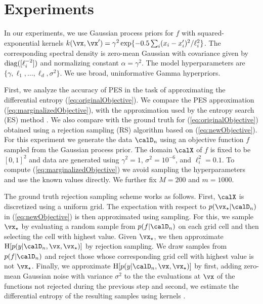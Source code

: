 \section{Experiments}
\label{sec:experiments}

In our experiments, we use Gaussian process priors for $f$ with squared-exponential
kernels $k(\x,\x')=\gamma^2\exp\{-0.5 \sum_i (x_i-x_i')^2/\ell_i^2\}$.
The corresponding spectral density is zero-mean
Gaussian with covariance given by $\mathrm{diag}([\ell_i^{-2}])$ and normalizing constant $\alpha=\gamma^2$.
The model hyperparameters are $\{\gamma,\ell_1,\dots,\ell_d,\sigma^2\}$. 
We use broad, uninformative Gamma hyperpriors. 

First, we analyze the accuracy of PES in the task of approximating the differential entropy
(\ref{eq:originalObjective}).  We compare the PES approximation
(\ref{eq:marginalizedObjective}),
with the approximation used by the entropy
search (ES) method \cite{HennigSchuler:2012}.  We also compare with the ground
truth for (\ref{eq:originalObjective}) obtained using a rejection sampling (RS)
algorithm based on (\ref{eq:newObjective}).  For this experiment we generate the
data $\D_n$ using an objective function $f$ sampled from the Gaussian
process prior. The domain $\X$ of $f$ is fixed to be $[0,1]^2$
and data are generated using $\gamma^2=1$, $\sigma^2=10^{-6}$, and
$\ell_i^2=0.1$. To compute (\ref{eq:marginalizedObjective}) we avoid
sampling the hyperparameters and use the known values directly.
We further fix $M=200$ and $m = 1000$.

The ground truth rejection sampling scheme works as follows.  First, $\X$ is discretized
using a uniform grid. The expectation with respect to $p(\xopt|\D_{n})$ in
(\ref{eq:newObjective}) is then approximated using sampling. For this, we sample
$\xopt$ by evaluating a random sample from $p(f|\D_n)$ on each grid cell and
then selecting the cell with highest value.  Given $\xopt$, we then approximate
$\H[p(y|\D_{n},\x,\xopt)]$ by rejection sampling. We draw samples from
$p(f|\D_n)$ and reject those whose corresponding grid cell with highest value is
not $\xopt$.  Finally, we approximate $\H[p(y|\D_{n},\x,\xopt)]$ by first,
adding zero-mean Gaussian noise with variance $\sigma^2$ to the the evaluations
at $\x$ of the functions not rejected during the previous step and
second, we estimate the differential entropy of the resulting samples using
kernels \cite{Ahmad:1976}.

